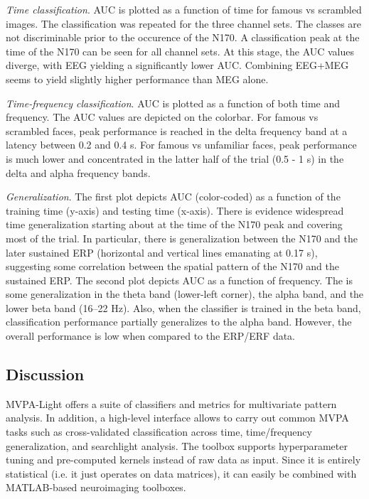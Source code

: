 \documentclass[utf8]{frontiersSCNS} %
\begin{document}
\textit{Time classification}. AUC is plotted as a function of time for famous vs scrambled images. The classification was repeated for the three channel sets. The classes are not discriminable prior to the occurence of the N170. A classification peak at the time of the N170 can be seen for all channel sets. At this stage, the AUC values diverge, with EEG yielding a significantly lower AUC. Combining EEG+MEG seems to yield slightly higher performance than MEG alone.

\textit{Time-frequency classification}. AUC is plotted as a function of both time and frequency. The AUC values are depicted on the colorbar. For famous vs scrambled faces, peak performance is reached in the delta frequency band at a latency between 0.2 and 0.4 s. For famous vs unfamiliar faces, peak performance is much lower and concentrated in the latter half of the trial (0.5 - 1 s) in the delta and alpha frequency bands. 

\textit{Generalization}. The first plot depicts AUC (color-coded) as a function of the training time (y-axis) and testing time (x-axis). There is evidence widespread time generalization starting about at the time of the N170 peak and covering most of the trial. In particular, there is generalization between the N170 and the later sustained ERP (horizontal and vertical lines emanating at 0.17 s), suggesting some correlation between the spatial pattern of the N170 and the sustained ERP. 
The second plot depicts AUC as a function of frequency. The is some generalization in the theta band (lower-left corner), the alpha band, and the lower beta band (16--22 Hz). Also, when the classifier is trained in the beta band, classification performance partially generalizes to the alpha band. However, the overall performance is low when compared to the ERP/ERF data. 


\subsection{Discussion}

MVPA-Light offers a suite of classifiers and metrics for multivariate pattern analysis. In addition, a high-level interface allows to carry out common MVPA tasks such as cross-validated classification across time, time/frequency generalization, and searchlight analysis. The toolbox supports hyperparameter tuning and pre-computed kernels instead of raw data as input. Since it is entirely statistical (i.e. it just operates on data matrices), it can easily be combined with MATLAB-based neuroimaging toolboxes. 
\end{document}
